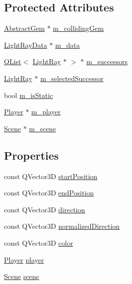 \subsection*{Protected Attributes}
\begin{DoxyCompactItemize}
\item 
\hyperlink{class_abstract_gem}{Abstract\+Gem} $\ast$ \hyperlink{class_light_ray_ac11396a5ac4a0899ca4bad5d88300fdd}{m\+\_\+colliding\+Gem}
\item 
\hyperlink{class_light_ray_data}{Light\+Ray\+Data} $\ast$ \hyperlink{class_light_ray_acba0c9beeba8ea2863a022910d4ffc34}{m\+\_\+data}
\item 
\hyperlink{class_q_list}{Q\+List}$<$ \hyperlink{class_light_ray}{Light\+Ray} $\ast$ $>$ $\ast$ \hyperlink{class_light_ray_a669e04446c77fc44bee41146c1883356}{m\+\_\+successors}
\item 
\hyperlink{class_light_ray}{Light\+Ray} $\ast$ \hyperlink{class_light_ray_a9e430528b861007696716fbd054c9de3}{m\+\_\+selected\+Successor}
\item 
bool \hyperlink{class_light_ray_af44c254c7782710304489afdabd5303a}{m\+\_\+is\+Static}
\item 
\hyperlink{class_player}{Player} $\ast$ \hyperlink{class_light_ray_a55cf457d13b240178933f0a73d6f7b2b}{m\+\_\+player}
\item 
\hyperlink{class_scene}{Scene} $\ast$ \hyperlink{class_light_ray_a9f99d6386ed92c979889f38b5348d628}{m\+\_\+scene}
\end{DoxyCompactItemize}
\subsection*{Properties}
\begin{DoxyCompactItemize}
\item 
const Q\+Vector3\+D \hyperlink{class_light_ray_af91b7c6c3c299e2a39b8c7f016f9ce15}{start\+Position}
\item 
const Q\+Vector3\+D \hyperlink{class_light_ray_a79917df93dd2cc9c8915fe659b3dd0da}{end\+Position}
\item 
const Q\+Vector3\+D \hyperlink{class_light_ray_a001a750a7d287ce54dd1772aa18be6c7}{direction}
\item 
const Q\+Vector3\+D \hyperlink{class_light_ray_ae6599fa543d56b2c812afa16f5ac4bbc}{normalized\+Direction}
\item 
const Q\+Vector3\+D \hyperlink{class_light_ray_ad03c134ce8b910618409f74d1267ff9b}{color}
\item 
\hyperlink{class_player}{Player} \hyperlink{class_light_ray_ac86091ec591fbf919bcc6c97beee47ec}{player}
\item 
\hyperlink{class_scene}{Scene} \hyperlink{class_light_ray_afd3d673f6ca3570f648bb706d7f2d6e6}{scene}
\end{DoxyCompactItemize}


